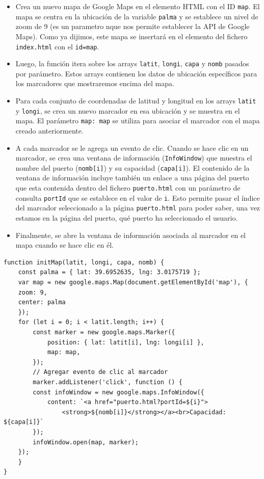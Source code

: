 \documentclass{article}
\begin{document}
\begin{enumerate}
\begin{itemize}
        \item Crea un nuevo mapa de Google Maps en el elemento HTML con el ID \texttt{map}. El mapa se centra en la ubicación de la variable \texttt{palma} y se establece un nivel de zoom de 9 (es un parametro nque nos permite establecer la API de Google Maps). Como ya dijimos, este mapa se insertará en el elemento del fichero \texttt{index.html} con el \texttt{id=map}.
        
        \item Luego, la función itera sobre los arrays \texttt{latit}, \texttt{longi}, \texttt{capa} y \texttt{nomb} pasados por parámetro. Estos arrays contienen los datos de ubicación específicos para los marcadores que mostraremos encima del mapa.
        
        \item Para cada conjunto de coordenadas de latitud y longitud en los arrays \texttt{latit} y \texttt{longi}, se crea un nuevo marcador en esa ubicación y se muestra en el mapa. El parámetro \texttt{map: map} se utiliza para asociar el marcador con el mapa creado anteriormente.
        
        \item A cada marcador se le agrega un evento de clic. Cuando se hace clic en un marcador, se crea una ventana de información (\texttt{InfoWindow}) que muestra el nombre del puerto (\texttt{nomb[i]}) y su capacidad (\texttt{capa[i]}). El contenido de la ventana de información incluye también un enlace a una página del puerto que esta contenida dentro del fichero \texttt{puerto.html} con un parámetro de consulta \texttt{portId} que se establece en el valor de \texttt{i}. Esto permite pasar el índice del marcador seleccionado a la página \texttt{puerto.html} para poder saber, una vez estamos en la página del puerto, qué puerto ha seleccionado el usuario.
        
        \item Finalmente, se abre la ventana de información asociada al marcador en el mapa cuando se hace clic en él.
    \end{itemize}
    \begin{verbatim}
function initMap(latit, longi, capa, nomb) {
    const palma = { lat: 39.6952635, lng: 3.0175719 };
    var map = new google.maps.Map(document.getElementById('map'), {
    zoom: 9,
    center: palma
    });
    for (let i = 0; i < latit.length; i++) {
        const marker = new google.maps.Marker({
            position: { lat: latit[i], lng: longi[i] },
            map: map,
        });
        // Agregar evento de clic al marcador
        marker.addListener('click', function () {
        const infoWindow = new google.maps.InfoWindow({
            content: `<a href="puerto.html?portId=${i}">
                <strong>${nomb[i]}</strong></a><br>Capacidad: ${capa[i]}`
        });
        infoWindow.open(map, marker);
    });
    }
}
    \end{verbatim}
\end{enumerate}
\end{document}
